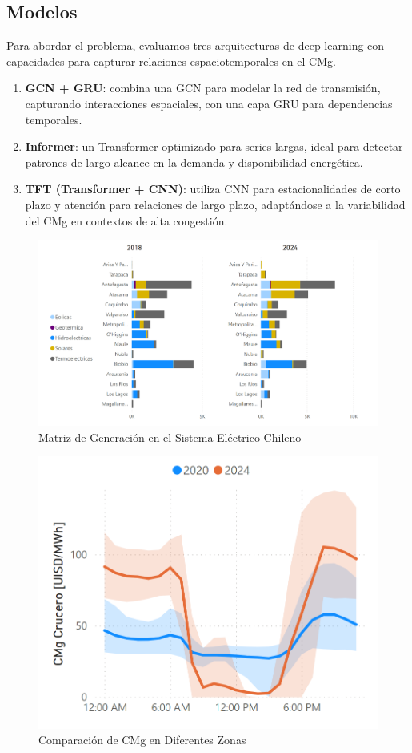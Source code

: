 \documentclass[twocolumn]{article}
\begin{document}
\subsection{Modelos}
Para abordar el problema, evaluamos tres arquitecturas de deep learning con capacidades para capturar relaciones espaciotemporales en el CMg.
\begin{enumerate}
    \item \textbf{GCN + GRU}: combina una GCN para modelar la red de transmisión, capturando interacciones espaciales, con una capa GRU para dependencias temporales.
    \item \textbf{Informer}: un Transformer optimizado para series largas, ideal para detectar patrones de largo alcance en la demanda y disponibilidad energética.
    \item \textbf{TFT (Transformer + CNN)}: utiliza CNN para estacionalidades de corto plazo y atención para relaciones de largo plazo, adaptándose a la variabilidad del CMg en contextos de alta congestión.
\end{enumerate}

\begin{figure}[h]
\centering
\includegraphics[width=0.8\columnwidth]{articulo/imgs/matriz_sist.png}
\caption{Matriz de Generación en el Sistema Eléctrico Chileno}
\end{figure}

\begin{figure}[h]
\centering
\includegraphics[width=0.8\columnwidth]{articulo/imgs/cmg_comparacion.png}
\caption{Comparación de CMg en Diferentes Zonas}
\end{figure}
\end{document}
